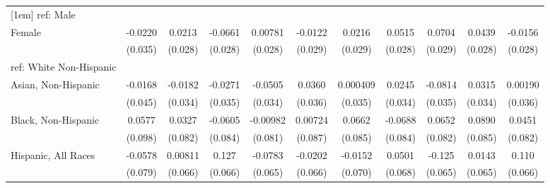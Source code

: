 \begin{table}[htbp]
\begin{tabular}{l*{10}{c}}
[1em]
ref: Male&                     &                     &                     &                     &                     &                     &                     &                     &                     &                     \\
[1em]
Female&     -0.0220         &      0.0213         &     -0.0661\sym{**} &     0.00781         &     -0.0122         &      0.0216         &      0.0515\sym{*}  &      0.0704\sym{**} &      0.0439         &     -0.0156         \\
  &     (0.035)         &     (0.028)         &     (0.028)         &     (0.028)         &     (0.029)         &     (0.029)         &     (0.028)         &     (0.029)         &     (0.028)         &     (0.028)         \\
[1em]
ref: White Non-Hispanic&                     &                     &                     &                     &                     &                     &                     &                     &                     &                     \\
[1em]
Asian, Non-Hispanic&     -0.0168         &     -0.0182         &     -0.0271         &     -0.0505         &      0.0360         &    0.000409         &      0.0245         &     -0.0814\sym{**} &      0.0315         &     0.00190         \\
  &     (0.045)         &     (0.034)         &     (0.035)         &     (0.034)         &     (0.036)         &     (0.035)         &     (0.034)         &     (0.035)         &     (0.034)         &     (0.036)         \\
[1em]
Black, Non-Hispanic&      0.0577         &      0.0327         &     -0.0605         &    -0.00982         &     0.00724         &      0.0662         &     -0.0688         &      0.0652         &      0.0890         &      0.0451         \\
  &     (0.098)         &     (0.082)         &     (0.084)         &     (0.081)         &     (0.087)         &     (0.085)         &     (0.084)         &     (0.082)         &     (0.085)         &     (0.082)         \\
[1em]
Hispanic, All Races&     -0.0578         &     0.00811         &       0.127\sym{*}  &     -0.0783         &     -0.0202         &     -0.0152         &      0.0501         &      -0.125\sym{*}  &      0.0143         &       0.110\sym{*}  \\
  &     (0.079)         &     (0.066)         &     (0.066)         &     (0.065)         &     (0.066)         &     (0.070)         &     (0.068)         &     (0.065)         &     (0.065)         &     (0.066)         \\

\end{tabular}
\end{table}
